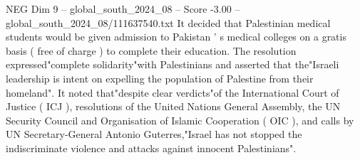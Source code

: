 \begin{textsample}{NEG Dim 9 – global\_south\_2024\_08 – Score -3.00 – global\_south\_2024\_08/111637540.txt}
It decided that Palestinian medical students would be given admission to Pakistan ' s medical colleges on a gratis basis ( free of charge ) to complete their education.
The resolution expressed"complete solidarity"with Palestinians and asserted that the"Israeli leadership is intent on expelling the population of Palestine from their homeland".
It noted that"despite clear verdicts"of the International Court of Justice ( ICJ ), resolutions of the United Nations General Assembly, the UN Security Council and Organisation of Islamic Cooperation ( OIC ), and calls by UN Secretary-General Antonio Guterres,"Israel has not stopped the indiscriminate violence and attacks against innocent Palestinians".

\end{textsample}
